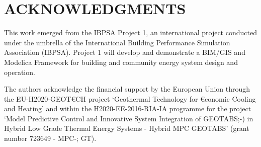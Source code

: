 \documentclass[10pt]{article}
\begin{document}
%
%


\section*{ACKNOWLEDGMENTS}

This work emerged from the IBPSA Project 1, an international project conducted under the umbrella of the International Building Performance Simulation Association (IBPSA). Project 1 will develop and demonstrate a BIM/GIS and Modelica Framework for building and community energy system design and operation.

The authors acknowledge the financial support by the European Union through  the EU-H2020-GEOT\euro CH 
project ‘Geothermal Technology for \euro conomic Cooling and Heating’ 
and within the H2020-EE-2016-RIA-IA programme for the project ‘Model Predictive Control and Innovative System Integration of GEOTABS;-) 
in Hybrid Low Grade Thermal Energy Systems - Hybrid MPC GEOTABS’ (grant number 723649 - MPC-; GT). 
\end{document}
